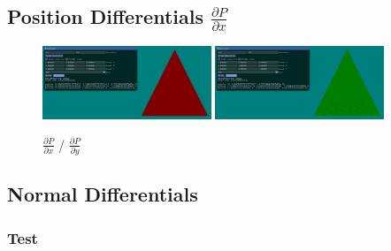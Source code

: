 \documentclass[12pt]{article}
\newcommand{\oneimgwidth}{0.45}
\newcommand{\dpdx}{\frac{\partial P}{\partial x}}
\newcommand{\dpdy}{\frac{\partial P}{\partial y}}
\begin{document}
\FloatBarrier

\subsection{Position Differentials $\dpdx$}

\begin{figure}[htbp] 
	\centering
	\includegraphics[width=\oneimgwidth\textwidth]{dp/dpdx.png}
	\includegraphics[width=\oneimgwidth\textwidth]{dp/dpdy.png}
	\caption{$\dpdx$ / $\dpdy$}
	\label{fig:dpdx}
\end{figure}

\FloatBarrier

\subsection{Normal Differentials}

\subsubsection{Test}
\end{document}
